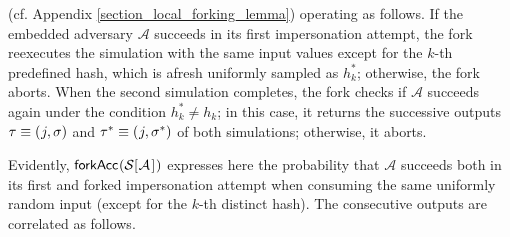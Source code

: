 \documentclass{iacrtrans}
\begin{document}
(cf. Appendix \ref{section_local_forking_lemma})
operating as follows.
If the embedded adversary $\mathcal{A}$
succeeds in its first
impersonation attempt,
the fork reexecutes the simulation
with the same input values except
for the $k$-th predefined hash,
which is afresh uniformly sampled as $h_k^*$;
otherwise, the fork aborts.
When the second simulation completes,
the fork checks if $\mathcal{A}$
succeeds again under the condition $h_k^* \neq h_k$;
in this case, it returns the successive outputs
$\tau \equiv (\hspace{0.5pt}j, \sigma)$
and $\tau^* \equiv (\hspace{0.5pt}j, \sigma^*)$
of both simulations; otherwise, it aborts.

Evidently,
$
\mathsf{forkAcc}
\hspace{0.5pt}
(
	\mathcal{S}
	[
		\hspace{0.5pt}
		\mathcal{A}
		\hspace{1pt}
	]
	\hspace{0.5pt}
)
$
expresses here the probability that $\mathcal{A}$
succeeds both in its first and forked impersonation attempt
when consuming the same uniformly random
input (except for the $k$-th distinct hash).
The consecutive outputs are correlated as follows.
\end{document}
